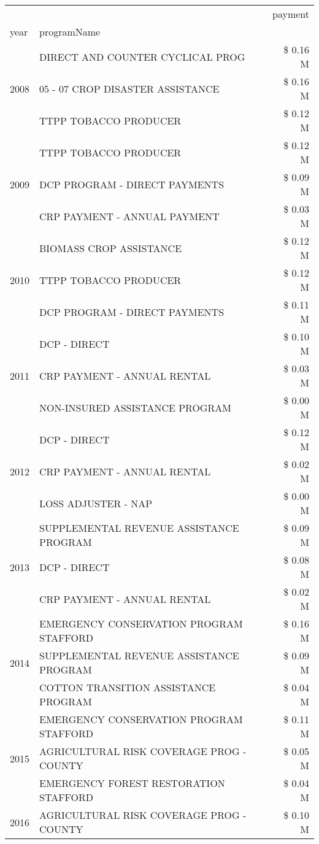 \begin{tabular}{llr}
\toprule
 &  & payment \\
year & programName &  \\
\midrule
\multirow[t]{3}{*}{2008} & DIRECT AND COUNTER CYCLICAL PROG & \$ 0.16 M \\
 & 05 - 07 CROP DISASTER ASSISTANCE & \$ 0.16 M \\
 & TTPP TOBACCO PRODUCER & \$ 0.12 M \\
\cline{1-3}
\multirow[t]{3}{*}{2009} & TTPP TOBACCO PRODUCER & \$ 0.12 M \\
 & DCP PROGRAM - DIRECT PAYMENTS & \$ 0.09 M \\
 & CRP PAYMENT - ANNUAL PAYMENT & \$ 0.03 M \\
\cline{1-3}
\multirow[t]{3}{*}{2010} & BIOMASS CROP ASSISTANCE & \$ 0.12 M \\
 & TTPP TOBACCO PRODUCER & \$ 0.12 M \\
 & DCP PROGRAM - DIRECT PAYMENTS & \$ 0.11 M \\
\cline{1-3}
\multirow[t]{3}{*}{2011} & DCP - DIRECT & \$ 0.10 M \\
 & CRP PAYMENT - ANNUAL RENTAL & \$ 0.03 M \\
 & NON-INSURED ASSISTANCE PROGRAM & \$ 0.00 M \\
\cline{1-3}
\multirow[t]{3}{*}{2012} & DCP - DIRECT & \$ 0.12 M \\
 & CRP PAYMENT - ANNUAL RENTAL & \$ 0.02 M \\
 & LOSS ADJUSTER - NAP & \$ 0.00 M \\
\cline{1-3}
\multirow[t]{3}{*}{2013} & SUPPLEMENTAL REVENUE ASSISTANCE PROGRAM & \$ 0.09 M \\
 & DCP - DIRECT & \$ 0.08 M \\
 & CRP PAYMENT - ANNUAL RENTAL & \$ 0.02 M \\
\cline{1-3}
\multirow[t]{3}{*}{2014} & EMERGENCY CONSERVATION PROGRAM STAFFORD & \$ 0.16 M \\
 & SUPPLEMENTAL REVENUE ASSISTANCE PROGRAM & \$ 0.09 M \\
 & COTTON TRANSITION ASSISTANCE PROGRAM & \$ 0.04 M \\
\cline{1-3}
\multirow[t]{3}{*}{2015} & EMERGENCY CONSERVATION PROGRAM STAFFORD & \$ 0.11 M \\
 & AGRICULTURAL RISK COVERAGE PROG - COUNTY & \$ 0.05 M \\
 & EMERGENCY FOREST RESTORATION STAFFORD & \$ 0.04 M \\
\cline{1-3}
\multirow[t]{3}{*}{2016} & AGRICULTURAL RISK COVERAGE PROG - COUNTY & \$ 0.10 M \\

\end{tabular}
